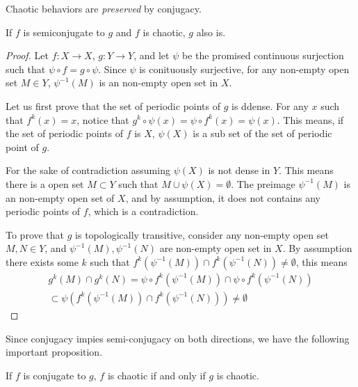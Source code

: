 Chaotic behaviors are \emph{preserved} by conjugacy.

\begin{thm}\label{th_semicong_chaos}
	If $f$ is semiconjugate to $g$ and $f$ is chaotic, $g$ also is.
\end{thm}

\begin{proof}
	Let $f: X \rightarrow X$, $g:  Y \rightarrow Y$, and let $\psi$ be the promised continuous surjection such that
	$\psi \circ f = g \circ \psi$. 
	Since $\psi$ is conituously surjective, for any non-empty open set $M \in Y$, $\psi^{-1}(M)$ is an non-empty open set in $X$.

	Let us first prove that the set of periodic points of $g$ is ddense.
	For any $x$ such that $f^k(x) = x$, notice that $g^k \circ \psi (x) = \psi \circ f^k (x) = \psi(x)$. 
	This means, if the set of periodic points of $f$ is $X$, $\psi(X)$ is a sub set of the set of periodic point of $g$.

	For the sake of contradiction assuming $\psi(X)$ is not dense in $Y$. 
	This means there is a open set $M \subset Y$ such that $M \cup \psi(X) = \emptyset$.
	The preimage $\psi^{-1}(M)$ is an non-empty open set of $X$, and by assumption, it does not contains any periodic points of $f$, which is a contradiction.

	To prove that $g$ is topologically transitive, consider any non-empty open set $M, N \in Y$, and $\psi^{-1}(M), \psi^{-1}(N)$ are non-empty open set in $X$. 
	By assumption there exists some $k$ such that $f^k(\psi^{-1}(M)) \cap f^k(\psi^{-1}(N)) \neq \emptyset$, this means 
	\begin{align*}
		g^k(M) \cap g^k(N) = \psi \circ f^k(\psi^{-1}(M)) \cap \psi \circ f^k(\psi^{-1}(N)) \\
		\subset \psi( f^k(\psi^{-1}(M)) \cap  f^k(\psi^{-1}(N))) \neq \emptyset
	\end{align*}
\end{proof}

Since conjugacy impies semi-conjugacy on both directions, we have the following important proposition.

\begin{prop}\label{prop_conj_chaos}
	If $f$ is conjugate to $g$, $f$ is chaotic if and only if $g$ is chaotic.
\end{prop}

